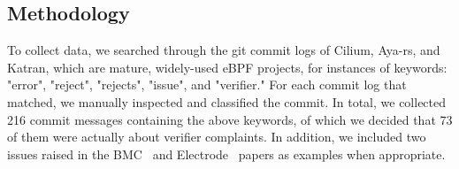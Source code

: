 


\subsection{Methodology}
To collect data, we searched through the git commit logs of Cilium, Aya-rs, and
    Katran, which are mature, widely-used eBPF projects, for instances of
    keywords: "error", "reject", "rejects", "issue", and "verifier."
For each commit log that matched, we manually inspected and classified the commit.
In total, we collected 216 commit messages containing the above keywords, of which we decided that 73 of them were actually about verifier complaints.
In addition, we included two issues raised in the BMC~\cite{BMC} and Electrode~\cite{Electrode} papers as examples when appropriate.

